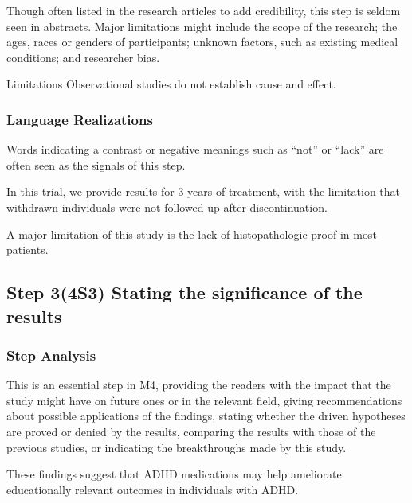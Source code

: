 \documentclass[a4paper]{ctexbook}
\begin{document}
    Though often listed in the research articles to add credibility, this step is seldom seen in abstracts. Major limitations might include the scope of the research; the ages, races or genders of participants; unknown factors, such as existing medical conditions; and researcher bias.

    \begin{eg}{}
      Limitations Observational studies do not establish cause and effect.
    \end{eg}

    \subsubsection{Language Realizations}

    Words indicating a contrast or negative meanings such as ``not'' or ``lack'' are often seen as the signals of this step.

    \begin{eg}{}
      In this trial, we provide results for 3 years of treatment, with the limitation that withdrawn individuals were \uline{not} followed up after discontinuation.   
    \end{eg}

    \begin{eg}{}
      A major limitation of this study is the \uline{lack} of histopathologic proof in most patients.     
    \end{eg}

  \subsection{Step 3(4S3) Stating the significance of the results}
    \subsubsection{Step Analysis}

    This is an essential step in M4, providing the readers with the impact that the study might have on future ones or in the relevant field, giving recommendations about possible applications of the findings, stating whether the driven hypotheses are proved or denied by the results, comparing the results with those of the previous studies, or indicating the breakthroughs made by this study.

    \begin{eg}{}
      These findings suggest that ADHD medications may help ameliorate educationally relevant outcomes in individuals with ADHD.
    \end{eg}
\end{document}
